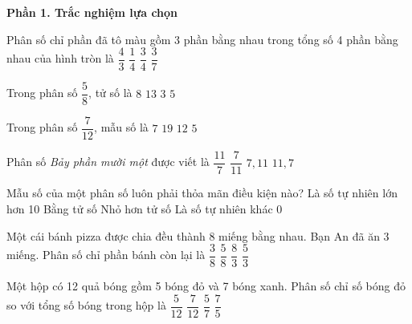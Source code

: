 \textbf{Phần 1. Trắc nghiệm lựa chọn}

\begin{ex} %
Phân số chỉ phần đã tô màu gồm 3 phần bằng nhau trong tổng số 4 phần bằng nhau của hình tròn là
\choice
{$\dfrac{4}{3}$}
{$\dfrac{1}{4}$}
{\True $\dfrac{3}{4}$}
{$\dfrac{3}{7}$}
\end{ex}

\begin{ex} %
Trong phân số $\dfrac{5}{8}$, tử số là
\choice
{$8$}
{$13$}
{$3$}
{\True $5$}
\end{ex}

\begin{ex} %
Trong phân số $\dfrac{7}{12}$, mẫu số là
\choice
{$7$}
{$19$}
{\True $12$}
{$5$}
\end{ex}

\begin{ex} %
Phân số \textit{Bảy phần mười một} được viết là
\choice
{$\dfrac{11}{7}$}
{\True $\dfrac{7}{11}$}
{$7{,}11$}
{$11{,}7$}
\end{ex}

\begin{ex} %
Mẫu số của một phân số luôn phải thỏa mãn điều kiện nào?
\choice
{Là số tự nhiên lớn hơn 10}
{Bằng tử số}
{Nhỏ hơn tử số}
{\True Là số tự nhiên khác 0}
\end{ex}

\begin{ex} %
Một cái bánh pizza được chia đều thành 8 miếng bằng nhau. Bạn An đã ăn 3 miếng. Phân số chỉ phần bánh còn lại là
\choice
{$\dfrac{3}{8}$}
{\True $\dfrac{5}{8}$}
{$\dfrac{8}{3}$}
{$\dfrac{5}{3}$}
\end{ex}

\begin{ex} %
Một hộp có 12 quả bóng gồm 5 bóng đỏ và 7 bóng xanh. Phân số chỉ số bóng đỏ so với tổng số bóng trong hộp là
\choice
{\True $\dfrac{5}{12}$}
{$\dfrac{7}{12}$}
{$\dfrac{5}{7}$}
{$\dfrac{7}{5}$}
\end{ex}

